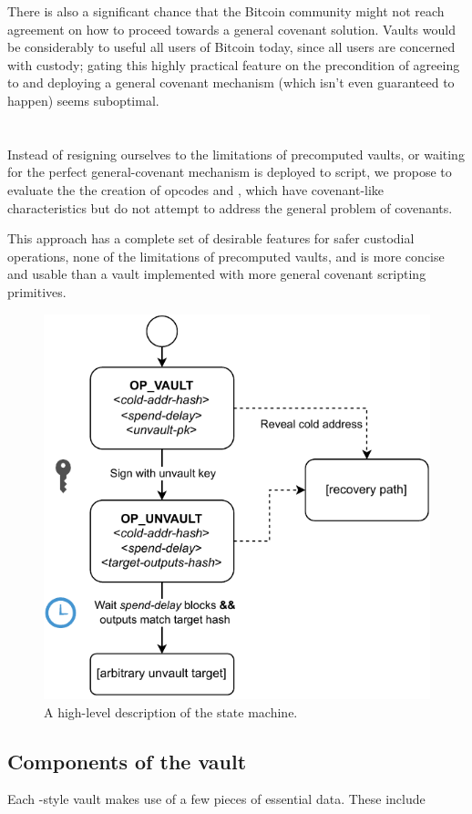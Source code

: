 \documentclass[10pt]{article}
\begin{document}
There is also a significant chance that the Bitcoin community might not reach agreement
on how to proceed towards a general covenant solution. Vaults would be considerably to
useful all users of Bitcoin today, since all users are concerned with custody;
gating this highly practical feature on the precondition of agreeing to and deploying a
general covenant mechanism (which isn't even guaranteed to happen) seems suboptimal.

\section*{\opv{}}

Instead of resigning ourselves to the limitations of precomputed vaults, or waiting for
the perfect general-covenant mechanism is deployed to script, we propose to evaluate
the the creation of opcodes \opv{} and \opuv{}, which have
covenant-like characteristics but do not attempt to address the general problem of
covenants.

This approach has a complete set of desirable features for safer custodial operations,
none of the limitations of precomputed vaults, and is more concise and usable than a
vault implemented with more general covenant scripting primitives.

\begin{figure}[H]
  \includegraphics[width=0.5\linewidth]{op-vault.pdf}
  \centering
  \caption{A high-level description of the \opv{} state machine.}
\end{figure}

\subsection*{Components of the vault}

Each \opv{}-style vault makes use of a few pieces of essential data. These include
\end{document}
